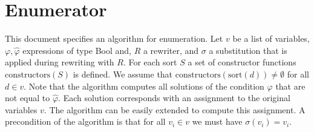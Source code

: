 \documentclass{article}
\begin{document}
\section{Enumerator}

This document specifies an algorithm for enumeration. Let $v$ be a list of
variables, $\varphi ,\widehat{\varphi }$ expressions of type Bool and, $R$ a
rewriter, and $\sigma $ a substitution that is applied during rewriting with 
$R$. For each sort $S$ a set of constructor functions $\mathrm{constructors}%
(S)$ is defined. We assume that $\mathrm{constructors}(\mathrm{sort}(d))\neq
\emptyset $ for all $d\in v$. Note that the algorithm computes all solutions
of the condition $\varphi $ that are not equal to $\widehat{\varphi }$. Each
solution corresponds with an assignment to the original variables $v$. The
algorithm can be easily extended to compute this assignment. A precondition
of the algorithm is that for all $v_{i}\in v$ we must have $\sigma
(v_{i})=v_{i}$.
\end{document}
